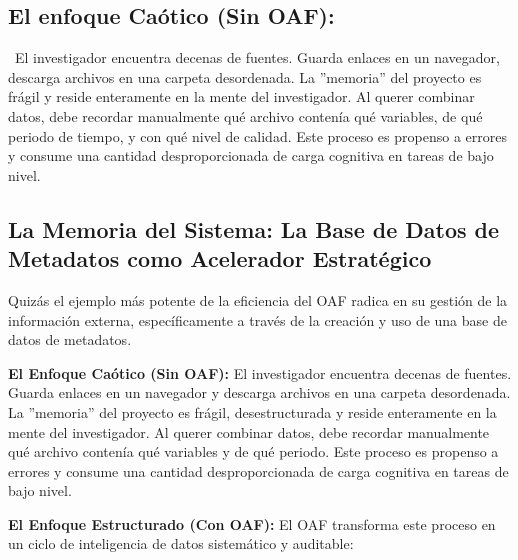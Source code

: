 \documentclass[11pt, a4paper]{article}
\begin{document}
\subsection{El enfoque Caótico (Sin OAF): } El investigador encuentra decenas de fuentes. Guarda enlaces en un navegador, descarga archivos en una carpeta desordenada. La ''memoria'' del proyecto es frágil y reside enteramente en la mente del investigador. Al querer combinar datos, debe recordar manualmente qué archivo contenía qué variables, de qué periodo de tiempo, y con qué nivel de calidad. Este proceso es propenso a errores y consume una cantidad desproporcionada de carga cognitiva en tareas de bajo nivel. 

\subsection{La Memoria del Sistema: La Base de Datos de Metadatos como Acelerador Estratégico}
\label{sec:metodologia_memoria}

Quizás el ejemplo más potente de la eficiencia del OAF radica en su gestión de la información externa, específicamente a través de la creación y uso de una base de datos de metadatos.

\textbf{El Enfoque Caótico (Sin OAF):} El investigador encuentra decenas de fuentes. Guarda enlaces en un navegador y descarga archivos en una carpeta desordenada. La ''memoria'' del proyecto es frágil, desestructurada y reside enteramente en la mente del investigador. Al querer combinar datos, debe recordar manualmente qué archivo contenía qué variables y de qué periodo. Este proceso es propenso a errores y consume una cantidad desproporcionada de carga cognitiva en tareas de bajo nivel.

\textbf{El Enfoque Estructurado (Con OAF):} El OAF transforma este proceso en un ciclo de inteligencia de datos sistemático y auditable:
\end{document}
